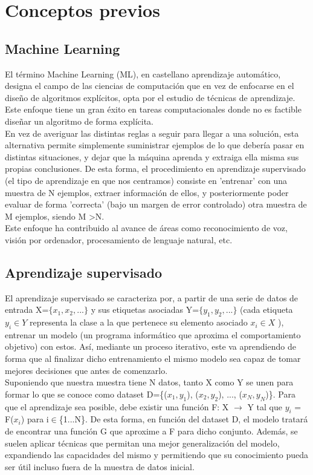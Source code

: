 \chapter{Conceptos previos}


\section{Machine Learning}

El término Machine Learning (ML), en castellano aprendizaje automático, designa el campo de las ciencias de computación que en vez de enfocarse en el diseño de algoritmos explícitos, opta por el estudio de técnicas de aprendizaje. Este enfoque tiene un gran éxito en tareas computacionales donde no es factible diseñar un algoritmo de forma explícita. \cite{Programming_Massively} \\
En vez de averiguar las distintas reglas a seguir para llegar a una solución, esta alternativa permite simplemente suministrar ejemplos de lo que debería pasar en distintas situaciones, y dejar que la máquina aprenda y extraiga ella misma sus propias conclusiones. De esta forma, el procedimiento en aprendizaje supervisado (el tipo de aprendizaje en que nos centramos) consiste en 'entrenar' con una muestra de N ejemplos, extraer información de ellos, y posteriormente poder evaluar de forma 'correcta' (bajo un margen de error controlado) otra muestra de M ejemplos, siendo M \textgreater N. \cite{Learning_From_Data} \\
Este enfoque ha contribuido al avance de áreas como reconocimiento de voz, visión por ordenador, procesamiento de lenguaje natural, etc.

\section{Aprendizaje supervisado}

El aprendizaje supervisado \cite{aprendizaje_supervisado} se caracteriza por, a partir de una serie de datos de entrada X=$\{x_1, x_2, ...\}$ y sus etiquetas asociadas Y=$\{y_1, y_2, ...\}$ (cada etiqueta $y_i \in Y$ representa la clase a la que pertenece su elemento asociado $x_i \in X$ \cite{etiquetas}), entrenar un modelo (un programa informático que aproxima el comportamiento objetivo) con estos. Así, mediante un proceso iterativo, este va aprendiendo de forma que al finalizar dicho entrenamiento el mismo modelo sea capaz de tomar mejores decisiones que antes de comenzarlo. \\
Suponiendo que nuestra muestra tiene N datos, tanto X como Y se unen para formar lo que se conoce como dataset D=\{($x_1, y_1$), ($x_2, y_2$), ..., ($x_N, y_N$)\}. Para que el aprendizaje sea posible, debe existir una función F: X $\rightarrow$ Y tal que $y_i$ = F($x_i$) para i$\in$\{1...N\}. De esta forma, en función del dataset D, el modelo tratará de encontrar una función G que aproxime a F para dicho conjunto. Además, se suelen aplicar técnicas que permitan una mejor generalización del modelo, expandiendo las capacidades del mismo y permitiendo que su conocimiento pueda ser útil incluso fuera de la muestra de datos inicial. \cite{Learning_From_Data}

